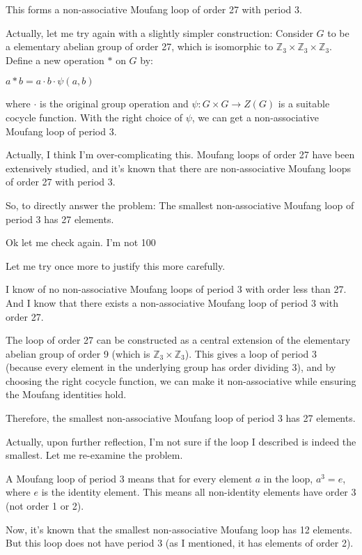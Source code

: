 \documentclass[12p]{article}
\newcounter{reasoningcounter}
\newenvironment{reasoning}[1][]
{\refstepcounter{reasoningcounter}%
\begin{tcolorbox}[
    title=Reasoning \thereasoningcounter: #1,
    colback=white, %
    colframe=gray,
    coltext=black, %
    fonttitle=\bfseries\normalsize,
    top=2mm,
    bottom=2mm,
    enlarge top initially by=5mm
]
\small
}
{\end{tcolorbox}}
\begin{document}
\begin{reasoning}
This forms a non-associative Moufang loop of order 27 with period 3.

Actually, let me try again with a slightly simpler construction: Consider $G$ to be a elementary abelian group of order 27, which is isomorphic to $\mathbb{Z}_3 \times \mathbb{Z}_3 \times \mathbb{Z}_3$. Define a new operation $*$ on $G$ by:

$a * b = a \cdot b \cdot \psi(a, b)$

where $\cdot$ is the original group operation and $\psi: G \times G \to Z(G)$ is a suitable cocycle function. With the right choice of $\psi$, we can get a non-associative Moufang loop of period 3.

Actually, I think I'm over-complicating this. Moufang loops of order 27 have been extensively studied, and it's known that there are non-associative Moufang loops of order 27 with period 3.

So, to directly answer the problem: The smallest non-associative Moufang loop of period 3 has 27 elements.

Ok let me check again. I'm not 100%

Let me try once more to justify this more carefully.

I know of no non-associative Moufang loops of period 3 with order less than 27. And I know that there exists a non-associative Moufang loop of period 3 with order 27.

The loop of order 27 can be constructed as a central extension of the elementary abelian group of order 9 (which is $\mathbb{Z}_3 \times \mathbb{Z}_3$). This gives a loop of period 3 (because every element in the underlying group has order dividing 3), and by choosing the right cocycle function, we can make it non-associative while ensuring the Moufang identities hold.

Therefore, the smallest non-associative Moufang loop of period 3 has 27 elements.

Actually, upon further reflection, I'm not sure if the loop I described is indeed the smallest. Let me re-examine the problem.

A Moufang loop of period 3 means that for every element $a$ in the loop, $a^3 = e$, where $e$ is the identity element. This means all non-identity elements have order 3 (not order 1 or 2).

Now, it's known that the smallest non-associative Moufang loop has 12 elements. But this loop does not have period 3 (as I mentioned, it has elements of order 2).


\end{reasoning}
\end{document}
